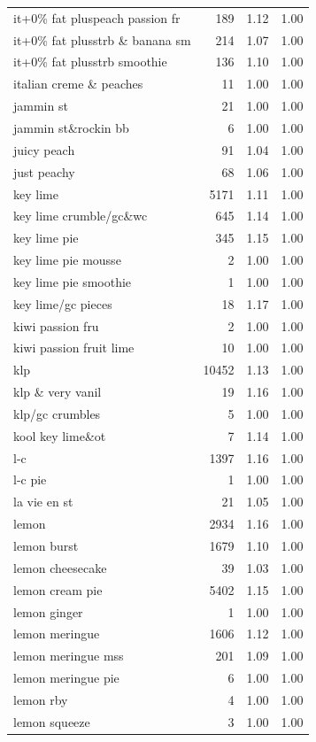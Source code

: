 \begin{table}
\begin{tabular}{lrrr}
it+0\% fat pluspeach passion fr & 189 & 1.12 & 1.00 \\
it+0\% fat plusstrb \& banana sm & 214 & 1.07 & 1.00 \\
it+0\% fat plusstrb smoothie & 136 & 1.10 & 1.00 \\
italian creme \& peaches & 11 & 1.00 & 1.00 \\
jammin st & 21 & 1.00 & 1.00 \\
jammin st\&rockin bb & 6 & 1.00 & 1.00 \\
juicy peach & 91 & 1.04 & 1.00 \\
just peachy & 68 & 1.06 & 1.00 \\
key lime & 5171 & 1.11 & 1.00 \\
key lime crumble/gc\&wc & 645 & 1.14 & 1.00 \\
key lime pie & 345 & 1.15 & 1.00 \\
key lime pie mousse & 2 & 1.00 & 1.00 \\
key lime pie smoothie & 1 & 1.00 & 1.00 \\
key lime/gc pieces & 18 & 1.17 & 1.00 \\
kiwi passion fru & 2 & 1.00 & 1.00 \\
kiwi passion fruit lime & 10 & 1.00 & 1.00 \\
klp & 10452 & 1.13 & 1.00 \\
klp \& very vanil & 19 & 1.16 & 1.00 \\
klp/gc crumbles & 5 & 1.00 & 1.00 \\
kool key lime\&ot & 7 & 1.14 & 1.00 \\
l-c & 1397 & 1.16 & 1.00 \\
l-c pie & 1 & 1.00 & 1.00 \\
la vie en st & 21 & 1.05 & 1.00 \\
lemon & 2934 & 1.16 & 1.00 \\
lemon burst & 1679 & 1.10 & 1.00 \\
lemon cheesecake & 39 & 1.03 & 1.00 \\
lemon cream pie & 5402 & 1.15 & 1.00 \\
lemon ginger & 1 & 1.00 & 1.00 \\
lemon meringue & 1606 & 1.12 & 1.00 \\
lemon meringue mss & 201 & 1.09 & 1.00 \\
lemon meringue pie & 6 & 1.00 & 1.00 \\
lemon rby & 4 & 1.00 & 1.00 \\
lemon squeeze & 3 & 1.00 & 1.00 \\

\end{tabular}
\end{table}
